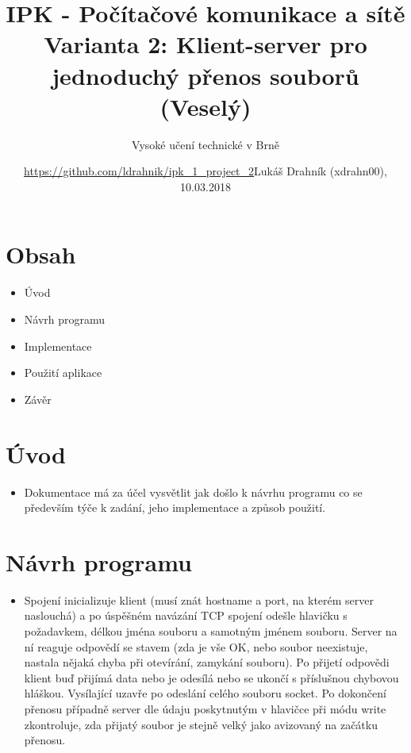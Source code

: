 \documentclass[a4paper,11pt]{article}
\title{IPK - Počítačové komunikace a sítě\\
{\bf\large Varianta 2: Klient-server pro jednoduchý přenos souborů (Veselý)}}
\author{Vysoké učení technické v Brně}
\date{\url{https://github.com/ldrahnik/ipk_1_project_2}}
\date{Lukáš Drahník (xdrahn00), 10.03.2018}
\begin{document}
{\let\newpage\relax\maketitle}

\newpage

\section*{Obsah}
\begin{itemize}
  \item Úvod
  \item Návrh programu
  \item Implementace
  \item Použití aplikace
  \item Závěr
\end{itemize}

\newpage

\section*{Úvod}
\begin{itemize}
  \item Dokumentace má za účel vysvětlit jak došlo k návrhu programu co se především týče k zadání, jeho implementace a způsob použití.
\end{itemize}

\section*{Návrh programu}
\begin{itemize}
  \item Spojení inicializuje klient (musí znát hostname a port, na kterém server naslouchá) a po
úspěšném navázání TCP spojení odešle hlavičku s požadavkem, délkou jména souboru a samotným jménem souboru. Server na
ní reaguje odpovědí se stavem (zda je vše OK, nebo soubor neexistuje, nastala nějaká
chyba při otevírání, zamykání souboru). Po přijetí odpovědi klient buď přijímá data nebo je odesílá nebo se ukončí s příslušnou
chybovou hláškou. Vysílající uzavře po odeslání celého souboru socket. Po dokončení přenosu případně server dle údaju poskytnutým v hlavičce při módu write zkontroluje,
zda přijatý soubor je stejně velký jako avizovaný na začátku přenosu.
\end{itemize}
\end{document}

